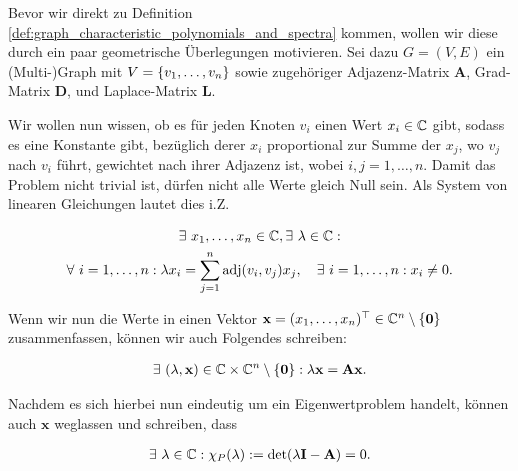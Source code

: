         \begin{remark} \label{rem:motivation}

            Bevor wir direkt zu Definition \ref{def:graph_characteristic_polynomials_and_spectra} kommen, wollen wir diese durch ein paar geometrische Überlegungen motivieren.
            Sei dazu $G = (V, E)$ ein (Multi-)Graph mit $V = {\left \{ v_1, \dots, v_n \right \}}$ sowie zugehöriger Adjazenz-Matrix $\mathbf A$, Grad-Matrix $\mathbf D$, und Laplace-Matrix $\mathbf L$.

            Wir wollen nun wissen, ob es für jeden Knoten $v_i$ einen Wert $x_i \in \mathbb C$ gibt, sodass es eine Konstante gibt, bezüglich derer $x_i$ proportional zur Summe der $x_j$, wo $v_j$ nach $v_i$ führt, gewichtet nach ihrer Adjazenz ist, wobei $i, j = 1, \dots, n$.
            Damit das Problem nicht trivial ist, dürfen nicht alle Werte gleich Null sein.
            Als System von linearen Gleichungen lautet dies i.Z.

            \begin{multline*}
                \exists ~ x_1, \dots, x_n \in \mathbb C,
                \exists ~ \lambda \in \mathbb C: \\
                    \forall ~ i = 1, \dots, n:
                        \lambda x_i
                        =
                        \sum_{j=1}^n \operatorname{adj}(v_i, v_j) x_j,
                    \quad
                    \exists ~ i = 1, \dots, n:
                        x_i \neq 0.
            \end{multline*}

            Wenn wir nun die Werte in einen Vektor $\mathbf x = (x_1, \dots, x_n)^\top \in \mathbb C^n \setminus {\left \{ \mathbf 0 \right \}}$ zusammenfassen, können wir auch Folgendes schreiben:

            \begin{align*}
                \exists ~ (\lambda, \mathbf x) \in \mathbb C \times \mathbb C^n \setminus {\left \{ \mathbf 0 \right \}}:
                    \lambda \mathbf x
                    =
                    \mathbf A \mathbf x.
            \end{align*}

            Nachdem es sich hierbei nun eindeutig um ein Eigenwertproblem handelt, können auch $\mathbf x$ weglassen und schreiben, dass

            \begin{align*}
                \exists ~ \lambda \in \mathbb C:
                    \chi_P(\lambda) := \det(\lambda \mathbf I - \mathbf A) = 0.
            \end{align*}


\end{remark}
